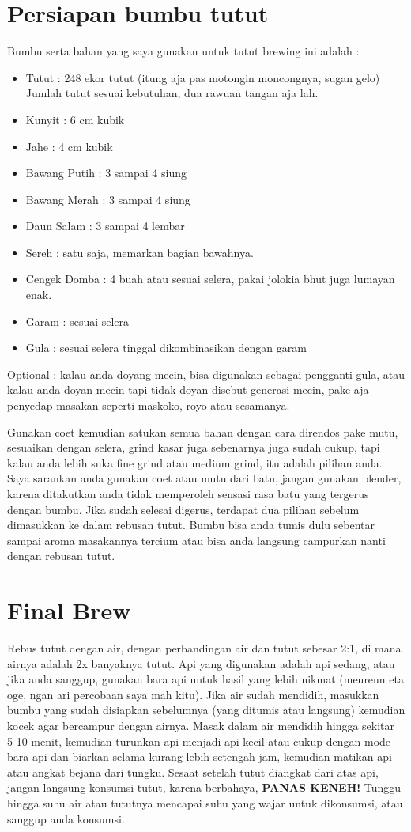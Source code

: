 \documentclass[a4paper]{article}
\begin{document}
\begin{multicols}{2}
\section{Persiapan bumbu tutut}
Bumbu serta bahan yang saya gunakan untuk tutut brewing ini adalah :
\begin{itemize}\item Tutut : 248 ekor tutut (itung aja pas motongin moncongnya, sugan gelo) Jumlah tutut sesuai kebutuhan, dua rawuan tangan aja lah.
\item Kunyit : 6 cm kubik
\item Jahe : 4 cm kubik
\item Bawang Putih : 3 sampai 4 siung
\item Bawang Merah : 3 sampai 4 siung
\item Daun Salam : 3 sampai 4 lembar
\item Sereh : satu saja, memarkan bagian bawahnya.
\item Cengek Domba : 4 buah atau sesuai selera, pakai jolokia bhut juga lumayan enak.
\item Garam : sesuai selera
\item Gula : sesuai selera tinggal dikombinasikan dengan garam
\end{itemize}
Optional : kalau anda doyang mecin, bisa digunakan sebagai pengganti gula, atau kalau anda doyan mecin tapi tidak doyan disebut generasi mecin, pake aja penyedap masakan seperti maskoko, royo atau sesamanya.

Gunakan coet kemudian satukan semua bahan dengan cara direndos pake mutu, sesuaikan dengan selera, grind kasar juga sebenarnya juga sudah cukup, tapi kalau anda lebih suka fine grind atau medium grind, itu adalah pilihan anda. Saya sarankan anda gunakan coet atau mutu dari batu, jangan gunakan blender, karena ditakutkan anda tidak memperoleh sensasi rasa batu yang tergerus dengan bumbu.
Jika sudah selesai digerus, terdapat dua pilihan sebelum dimasukkan ke dalam rebusan tutut. Bumbu bisa anda tumis dulu sebentar sampai aroma masakannya tercium atau bisa anda langsung campurkan nanti dengan rebusan tutut.

\section{Final Brew}
Rebus tutut dengan air, dengan perbandingan air dan tutut sebesar 2:1, di mana airnya adalah 2x banyaknya tutut. Api yang digunakan adalah api sedang, atau jika anda sanggup, gunakan bara  api untuk hasil yang lebih nikmat (meureun eta oge, ngan ari percobaan saya mah kitu).
Jika air sudah mendidih, masukkan bumbu yang sudah disiapkan sebelumnya (yang ditumis atau langsung) kemudian kocek agar bercampur dengan airnya. Masak dalam air mendidih hingga sekitar 5-10 menit, kemudian turunkan api menjadi api kecil atau cukup dengan mode bara api dan biarkan selama kurang lebih setengah jam, kemudian matikan api atau angkat bejana dari tungku.
Sesaat setelah tutut diangkat dari atas api, jangan langsung konsumsi tutut, karena berbahaya, \textbf{PANAS KENEH!} Tunggu hingga suhu air atau tututnya mencapai suhu yang wajar untuk dikonsumsi, atau sanggup anda konsumsi.
\end{multicols}
\end{document}
